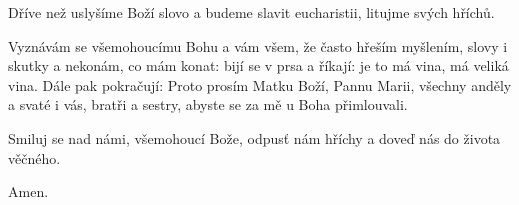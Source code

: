 \Vbardot{} Dříve než uslyšíme Boží slovo a budeme slavit eucharistii, litujme svých hříchů.

Vyznávám se všemohoucímu Bohu a vám všem, že často hřeším myšlením, slovy
i skutky a nekonám, co mám konat: bijí se v prsa a říkají: je to má vina, má
veliká vina. Dále pak pokračují: Proto prosím Matku Boží, Pannu Marii,
všechny anděly a svaté i vás, bratři a sestry, abyste se za mě u Boha
přimlouvali.

\Vbardot{} Smiluj se nad námi, všemohoucí Bože, odpusť nám hříchy a doveď nás do života věčného.

\Rbardot{} Amen.
